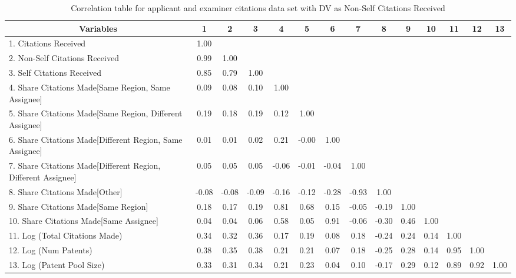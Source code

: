 \begin{table}[htbp]\centering \caption{Correlation table for applicant and examiner citations  data set with DV as Non-Self Citations Received\label{ae.ncorrelation}}
\scriptsize
\singlespacing
\begin{tabular}{l  c  c  c  c  c  c  c  c  c  c  c  c  c }\hline\hline
\multicolumn{1}{c}{Variables} &1&2&3&4&5&6&7&8&9&10&11&12&13\\ \hline
1. Citations Received&1.00\\
2. Non-Self Citations Received&0.99&1.00\\
3. Self Citations Received&0.85&0.79&1.00\\
4. Share Citations Made[Same Region, Same Assignee]&0.09&0.08&0.10&1.00\\
5. Share Citations Made[Same Region, Different Assignee]&0.19&0.18&0.19&0.12&1.00\\
6. Share Citations Made[Different Region, Same Assignee]&0.01&0.01&0.02&0.21&-0.00&1.00\\
7. Share Citations Made[Different Region, Different Assignee]&0.05&0.05&0.05&-0.06&-0.01&-0.04&1.00\\
8. Share Citations Made[Other]&-0.08&-0.08&-0.09&-0.16&-0.12&-0.28&-0.93&1.00\\
9. Share Citations Made[Same Region]&0.18&0.17&0.19&0.81&0.68&0.15&-0.05&-0.19&1.00\\
10. Share Citations Made[Same Assignee]&0.04&0.04&0.06&0.58&0.05&0.91&-0.06&-0.30&0.46&1.00\\
11. Log (Total Citations Made)&0.34&0.32&0.36&0.17&0.19&0.08&0.18&-0.24&0.24&0.14&1.00\\
12. Log (Num Patents)&0.38&0.35&0.38&0.21&0.21&0.07&0.18&-0.25&0.28&0.14&0.95&1.00\\
13. Log (Patent Pool Size)&0.33&0.31&0.34&0.21&0.23&0.04&0.10&-0.17&0.29&0.12&0.89&0.92&1.00\\
\hline \hline 
 \end{tabular}
\end{table}
